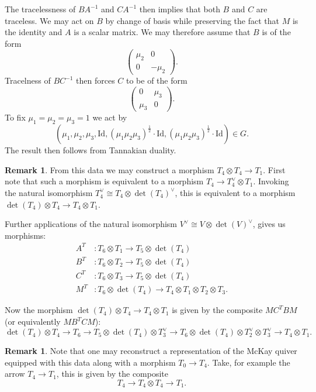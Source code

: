 \documentclass{amsart}
\theoremstyle{definition}
\newtheorem{rmk}[thm]{Remark}
\begin{document}
The tracelessness of $BA^{-1}$ and $CA^{-1}$ then implies that both $B$ and $C$ are traceless. We may act on $B$ by change of basis while preserving the fact that $M$ is the identity and $A$ is a scalar matrix. We may therefore assume that $B$ is of the form 
$$\begin{pmatrix}
\mu_2 & 0 \\
0 & - \mu_2
\end{pmatrix}.$$
Tracelness of $BC^{-1}$ then forces $C$ to be of the form 
$$\begin{pmatrix}
0 & \mu_3 \\
\mu_3 & 0
\end{pmatrix}.$$
To fix $\mu_1 = \mu_2 = \mu_3 = 1$ we act by $$(\mu_1, \mu_2, \mu_3, \text{Id}, (\mu_1\mu_2\mu_3)^\frac{1}{2}\cdot \text{Id}, (\mu_1\mu_2\mu_3)^\frac{1}{2}\cdot \text{Id}) \in G.$$ 
The result then follows from Tannakian duality.

\begin{rmk}
From this data we may construct a morphism $T_4 \otimes T_4 \rightarrow T_1$. First note that such a morphism is equivalent to a morphism $T_4 \rightarrow T_4^\vee \otimes T_1$. Invoking the natural isomorphism $T_4^\vee \cong T_4 \otimes \det(T_4)^\vee$, this is equivalent to a morphism $\det(T_4) \otimes T_4 \rightarrow T_4 \otimes T_1$.

Further applications of the natural isomorphism $V^\vee \cong V \otimes \det(V)^\vee$, gives us morphisms:
\begin{align*}
A^{T} &\colon T_6 \otimes T_1 \longrightarrow T_5 \otimes \det(T_4) \\
B^{T} &\colon T_6 \otimes T_2 \longrightarrow T_5 \otimes \det(T_4) \\
C^{T} &\colon T_6 \otimes T_3 \longrightarrow T_5 \otimes \det(T_4) \\
M^{T} &\colon T_6 \otimes \det(T_4) \longrightarrow T_4 \otimes T_1 \otimes T_2 \otimes T_3.
\end{align*}

Now the morphism $\det(T_4) \otimes T_4 \rightarrow T_4 \otimes T_1$ is given by the composite $MC^{T}BM$ (or equivalently $MB^{T}CM$): $$\det(T_4) \otimes T_4 \rightarrow T_6 \rightarrow T_5 \otimes \det(T_4) \otimes T_3^\vee \rightarrow T_6 \otimes \det(T_4) \otimes T_2^\vee \otimes T_3^\vee \rightarrow T_4 \otimes T_1.$$
\end{rmk}

\begin{rmk}
Note that one may reconstruct a representation of the McKay quiver equipped with this data along with a morphism $T_0 \rightarrow T_4$. Take, for example the arrow $T_4 \rightarrow T_1$, this is given by the composite $$T_4 \rightarrow T_4 \otimes T_4 \rightarrow T_1.$$
\end{rmk}
\end{document}
